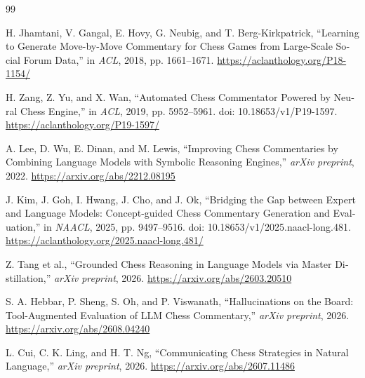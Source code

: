 \cleardoublepage
{}
{}
\renewcommand{\bibname}{منابع}
\begin{thebibliography}{99}
\setlength{\itemsep}{8pt}
\begin{latin}
H. Jhamtani, V. Gangal, E. Hovy, G. Neubig, and T. Berg-Kirkpatrick, “Learning to Generate Move-by-Move Commentary for Chess Games from Large-Scale Social Forum Data,” in \textit{ACL}, 2018, pp. 1661–1671. \url{https://aclanthology.org/P18-1154/}
\end{latin}
\begin{latin}
H. Zang, Z. Yu, and X. Wan, “Automated Chess Commentator Powered by Neural Chess Engine,” in \textit{ACL}, 2019, pp. 5952–5961. doi: 10.18653/v1/P19-1597. \url{https://aclanthology.org/P19-1597/}
\end{latin}
\begin{latin}
A. Lee, D. Wu, E. Dinan, and M. Lewis, “Improving Chess Commentaries by Combining Language Models with Symbolic Reasoning Engines,” \textit{arXiv preprint}, 2022. \url{https://arxiv.org/abs/2212.08195}
\end{latin}
\begin{latin}
J. Kim, J. Goh, I. Hwang, J. Cho, and J. Ok, “Bridging the Gap between Expert and Language Models: Concept-guided Chess Commentary Generation and Evaluation,” in \textit{NAACL}, 2025, pp. 9497–9516. doi: 10.18653/v1/2025.naacl-long.481. \url{https://aclanthology.org/2025.naacl-long.481/}
\end{latin}
\begin{latin}
Z. Tang et al., “Grounded Chess Reasoning in Language Models via Master Distillation,” \textit{arXiv preprint}, 2026. \url{https://arxiv.org/abs/2603.20510}
\end{latin}
\begin{latin}
S. A. Hebbar, P. Sheng, S. Oh, and P. Viswanath, “Hallucinations on the Board: Tool-Augmented Evaluation of LLM Chess Commentary,” \textit{arXiv preprint}, 2026. \url{https://arxiv.org/abs/2608.04240}
\end{latin}
\begin{latin}
L. Cui, C. K. Ling, and H. T. Ng, “Communicating Chess Strategies in Natural Language,” \textit{arXiv preprint}, 2026. \url{https://arxiv.org/abs/2607.11486}
\end{latin}
\begin{latin}

\end{latin}
\end{thebibliography}
